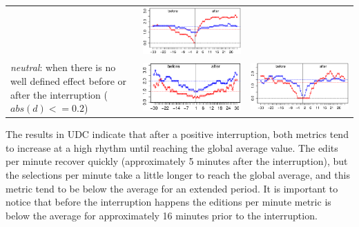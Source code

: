 \documentclass[times]{smrauth}
\begin{document}
\begin{table}[ht!]
\begin{tabular}{p{5cm} | c | c}
	& \includegraphics[valign=m,scale=0.24]{figures/udc_pos_ints_2} \\
\textit{neutral}: when there is no well defined effect before or after the interruption ($abs(d) <= 0.2$)
	& \includegraphics[valign=m,scale=0.3]{figures/neu_ints} 
	& \includegraphics[valign=m,scale=0.24]{figures/udc_neu_ints_2} 
\end{tabular}
\end{table}

The results in UDC indicate that after a positive interruption, both metrics tend to increase at a high rhythm until reaching the global average value. The edits per minute recover quickly (approximately 5 minutes after the interruption), but the selections per minute take a little longer to reach the global average, and this metric tend to be below the average for an extended period. It is important to notice that before the interruption happens the editions per minute metric is below the average for approximately 16 minutes prior to the interruption.
\end{document}

